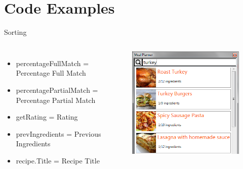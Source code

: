 \section{Code Examples}

\begin{frame}{Sorting}
    \begin{columns}
        \begin{itemize}
            \item percentageFullMatch = Percentage Full Match
            \item percentagePartialMatch = Percentage Partial Match
            \item getRating = Rating
            \item prevIngredients = Previous Ingredients
            \item recipe.Title = Recipe Title
        \end{itemize}
        \begin{figure}
            \centering
            \includegraphics[width=\textwidth]{graphics/recipe-search-item}
        \end{figure}
    \end{columns}

\end{frame}


